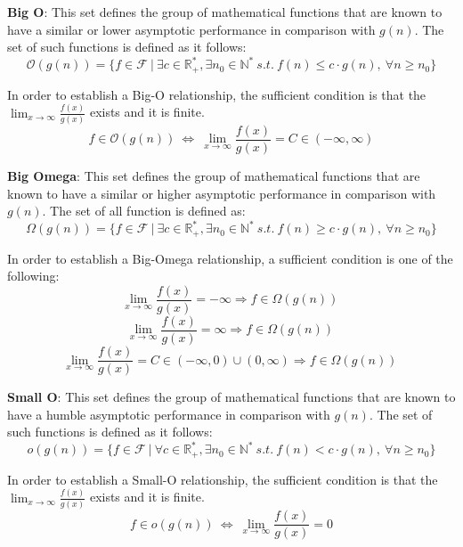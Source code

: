 \begin{definition}   
  \textbf{Big O}: This set defines the group of mathematical functions that are known to have a similar or lower
 asymptotic performance in comparison with  $g(n)$. The set of such functions is defined as it follows:
  \[\mathcal{O}(g(n)) = \lbrace f \in \mathcal{F}\ |\ \exists c \in \mathbb{R}^{*}_{+}, \exists n_{0} \in \mathbb{N}^{*}\ s.t.\  f(n) \leq c \cdot g(n),\  \forall n \geq n_{0} \rbrace\]
  \end{definition}  
  \begin{lemma}
  In order to establish a Big-O relationship, the sufficient condition is that the $ \lim_{x\to\infty} \frac{f(x)}{g(x)}$ exists and it is finite. 
  \[ f \in \mathcal{O}(g(n))\ \Leftrightarrow\ \lim_{x\to\infty} \frac{f(x)}{g(x)} = C \in (-\infty, \infty) \]
  \end{lemma}

  
\begin{definition}   
 \textbf{Big Omega}: This set defines the group of mathematical functions that are known to have a similar or higher asymptotic performance in comparison with  $g(n)$. The set of all function is defined as:
    \[\Omega(g(n)) = \lbrace f \in \mathcal{F}\ |\ \exists c \in \mathbb{R}^{*}_{+}, \exists n_{0} \in \mathbb{N}^{*}\ s.t.\  f(n) \geq c \cdot g(n),\  \forall n \geq n_{0} \rbrace\]
\end{definition}  

  \begin{lemma}
  In order to establish a Big-Omega relationship, a sufficient condition is one of the following:
    \[  \lim_{x\to\infty} \frac{f(x)}{g(x)} = -\infty \Rightarrow f \in \Omega(g(n))\ \]
    \[ \lim_{x\to\infty} \frac{f(x)}{g(x)} = \infty \Rightarrow f \in \Omega(g(n))\  \]
     \[ \lim_{x\to\infty} \frac{f(x)}{g(x)} = C \in (-\infty, 0) \cup (0,\infty) \Rightarrow f \in \Omega(g(n))\ \]
   \end{lemma}
   
\begin{definition}   
 \textbf{Small O}:
  This set defines the group of mathematical functions that are known to have a humble
 asymptotic performance in comparison with  $g(n)$. The set of such functions is defined as it follows:
  \[o(g(n)) = \lbrace f \in \mathcal{F}\ |\ \forall c \in \mathbb{R}^{*}_{+}, \exists n_{0} \in \mathbb{N}^{*}\ s.t.\  f(n) < c \cdot g(n),\  \forall n \geq n_{0} \rbrace\]
  \end{definition}  
  \begin{lemma}
In order to establish a Small-O relationship, the sufficient condition is that the $ \lim_{x\to\infty} \frac{f(x)}{g(x)}$ exists and it is finite. 
  \[ f \in o(g(n))\ \Leftrightarrow\ \lim_{x\to\infty} \frac{f(x)}{g(x)} = 0 \]  
  \end{lemma}
  
